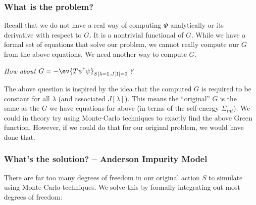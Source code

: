 \documentclass{article}
\begin{document}
\subsubsection*{What is the problem?}

Recall that we do not have a real way of computing $\Phi$ analytically or its derivative with respect to $G$. It is a nontrivial functional of $G$. While we have a formal set of equations that solve our problem, we cannot really compute our $G$ from the above equations. We need another way to compute $G$.

\textit{How about $G = -\ev{T \psi^\dagger \psi}_{S[\lambda=1, J[1]=0]}$? }

The above question is inspired by the idea that the computed $G$ is required to be constant for all $\lambda$ (and associated $J[\lambda]$). This means the ``original'' $G$ is the same as the $G$ we have equations for above (in terms of the self-energy $\Sigma_{int}$). 
We could in theory try using Monte-Carlo techniques to exactly find the above Green function. However, if we could do that for our original problem, we would have done that.

\subsubsection*{What's the solution? -- Anderson Impurity Model}

There are far too many degrees of freedom in our original action $S$ to simulate using Monte-Carlo techniques. We solve this by formally integrating out most degrees of freedom: 
\end{document}
